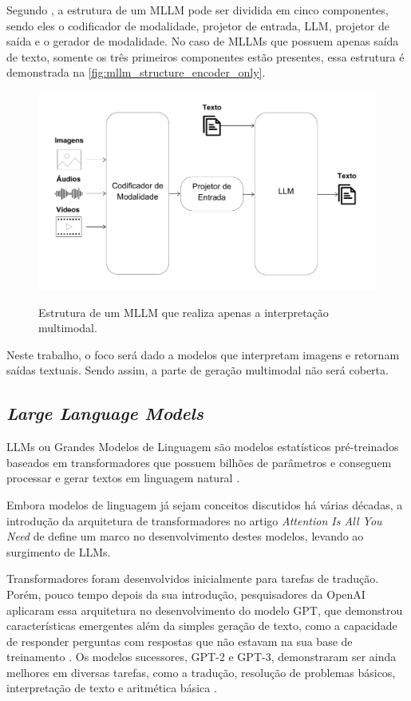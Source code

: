 Segundo \textcite{mllm_survey_2024}, a estrutura de um \ac{MLLM} pode ser dividida em cinco componentes, sendo eles o
codificador de modalidade, projetor de entrada, \ac{LLM}, projetor de saída e o gerador de modalidade. No caso de
\acp{MLLM} que possuem apenas saída de texto, somente os três primeiros componentes estão presentes, essa estrutura é
demonstrada na \autoref{fig:mllm_structure_encoder_only}.

\begin{figure}[ht]
    \centering
    \caption{\small Estrutura de um \ac{MLLM} que realiza apenas a interpretação multimodal.}
    \includegraphics[width=0.7\columnwidth,keepaspectratio]{images/mllm_structure_encoder_only.pdf}
    \label{fig:mllm_structure_encoder_only}
\end{figure}

Neste trabalho, o foco será dado a modelos que interpretam imagens e retornam saídas textuais. Sendo assim, a parte de
geração multimodal não será coberta.

\subsection{\textit{Large Language Models}}

\acp{LLM} ou Grandes Modelos de Linguagem são modelos estatísticos pré-treinados baseados em transformadores que
possuem bilhões de parâmetros e conseguem processar e gerar textos em linguagem natural \cite{llm_survey_2024}.

Embora modelos de linguagem já sejam conceitos discutidos há várias décadas, a introdução da arquitetura de
transformadores no artigo \textit{Attention Is All You Need} de \textcite{transformer} define um marco no
desenvolvimento destes modelos, levando ao surgimento de \acp{LLM}.

Transformadores foram desenvolvidos inicialmente para tarefas de tradução. Porém, pouco tempo depois da sua introdução,
pesquisadores da OpenAI aplicaram essa arquitetura no desenvolvimento do modelo \ac{GPT}, que demonstrou
características emergentes além da simples geração de texto, como a capacidade de responder perguntas com respostas que
não estavam na sua base de treinamento \cite{gpt1}. Os modelos sucessores, \ac{GPT}-2 e \ac{GPT}-3, demonstraram ser
ainda melhores em diversas tarefas, como a tradução, resolução de problemas básicos, interpretação de texto e
aritmética básica \cite{gpt2, gpt3}.


